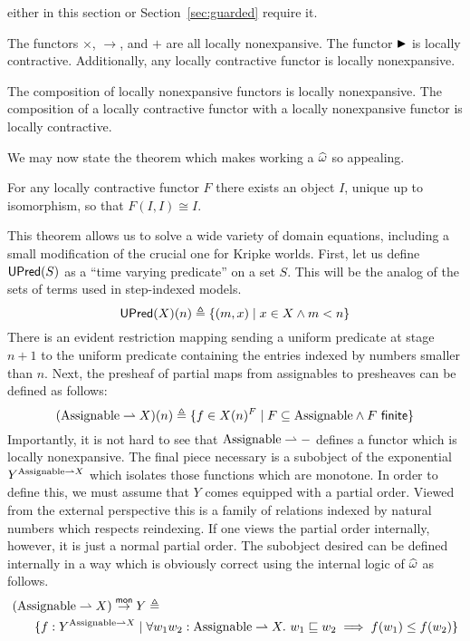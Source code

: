 either in this section or Section~\ref{sec:guarded} require it.
\begin{example}
  The functors $\times$, $\to$, and $+$ are all locally
  nonexpansive. The functor ${\blacktriangleright}$ is locally
  contractive. Additionally, any locally contractive functor is locally
  nonexpansive.
\end{example}
\begin{lem}
  The composition of locally nonexpansive functors is locally
  nonexpansive. The composition of a locally contractive functor with
  a locally nonexpansive functor is locally contractive.
\end{lem}
We may now state the theorem which makes working a
$\widehat{\omega}$ so appealing.
\begin{thm}\label{thm:steps:fixedpoints}
  For any locally contractive functor $F$ there exists an object $I$,
  unique up to isomorphism, so that $F(I, I) \cong I$.
\end{thm}
This theorem allows us to solve a wide variety of domain equations,
including a small modification of the crucial one for Kripke
worlds. First, let us define $\mathsf{UPred}(S)$ as a ``time varying
predicate'' on a set $S$. This will be the analog of the sets of terms
used in step-indexed models.
\[
  \mathsf{UPred}(X)(n) \triangleq \{(m, x) \mid x \in X \land m < n\}
\]
There is an evident restriction mapping sending a uniform predicate at
stage $n + 1$ to the uniform predicate containing the entries indexed
by numbers smaller than $n$. Next, the presheaf of partial maps from
assignables to presheaves can be defined as follows:
\[
  (\assignables \pto X)(n) \triangleq
  \{f \in X(n)^{F} \mid F \subseteq \assignables \land F\ \mathsf{finite}\}
\]
Importantly, it is not hard to see that $\mathrm{Assignable} \rightharpoonup -$ defines
a functor which is locally nonexpansive. The final piece necessary is
a subobject of the exponential $Y^{\mathrm{Assignable} \rightharpoonup X}$ which
isolates those functions which are monotone. In order to define this,
we must assume that $Y$ comes equipped with a partial order. Viewed
from the external perspective this is a family of relations indexed by
natural numbers which respects reindexing. If one views the partial
order internally, however, it is just a normal partial order. The
subobject desired can be defined internally in a way which is
obviously correct using the internal logic of $\widehat{\omega}$ as
follows.
\begin{align*}
  (\mathrm{Assignable} \rightharpoonup X) \overset{\mathsf{mon}}{\to} Y &\triangleq \\
  \{f : Y^{\mathrm{Assignable} \rightharpoonup X} \mid{}&
   \forall w_1 w_2 : \mathrm{Assignable} \rightharpoonup X.\ w_1 \mathrel{\sqsubseteq} w_2 \implies f(w_1) \le f(w_2)\}
\end{align*}
